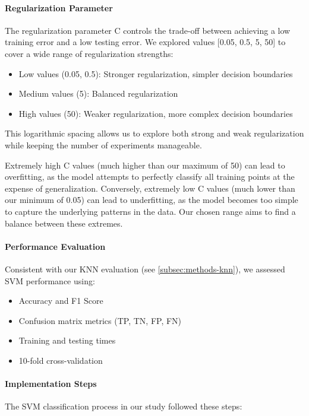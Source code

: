 \paragraph{Regularization Parameter}
The regularization parameter C controls the trade-off between achieving a low training error and a low testing error. 
We explored values [0.05, 0.5, 5, 50] to cover a wide range of regularization strengths:
\begin{itemize}
    \item Low values (0.05, 0.5): Stronger regularization, simpler decision boundaries
    \item Medium values (5): Balanced regularization
    \item High values (50): Weaker regularization, more complex decision boundaries
\end{itemize}
This logarithmic spacing allows us to explore both strong and weak regularization while keeping the number of experiments manageable.

Extremely high C values (much higher than our maximum of 50) can lead to overfitting, as the model attempts to perfectly classify all training points at the expense of generalization. Conversely, extremely low C values (much lower than our minimum of 0.05) can lead to underfitting, as the model becomes too simple to capture the underlying patterns in the data. Our chosen range aims to find a balance between these extremes.

\paragraph{Performance Evaluation}
Consistent with our KNN evaluation (see \autoref{subsec:methods-knn}), we assessed SVM performance using:
\begin{itemize}
    \item Accuracy and F1 Score
    \item Confusion matrix metrics (TP, TN, FP, FN)
    \item Training and testing times
    \item 10-fold cross-validation
\end{itemize}

\paragraph{Implementation Steps}

The SVM classification process in our study followed these steps:

